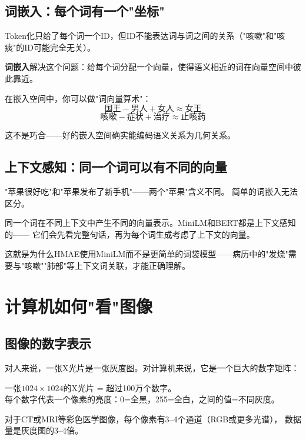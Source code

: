 \documentclass[11pt,a4paper]{ctexart}
\begin{document}
\subsection{词嵌入：每个词有一个"坐标"}

Token化只给了每个词一个ID，但ID不能表达词与词之间的关系（"咳嗽"和"咳痰"的ID可能完全无关）。

\textbf{词嵌入}解决这个问题：给每个词分配一个向量，使得语义相近的词在向量空间中彼此靠近。

\begin{exambox}[词嵌入空间中的有趣现象]
在嵌入空间中，你可以做"词向量算术"：
$$\text{国王} - \text{男人} + \text{女人} \approx \text{女王}$$
$$\text{咳嗽} - \text{症状} + \text{治疗} \approx \text{止咳药}$$

这不是巧合——好的嵌入空间确实能编码语义关系为几何关系。
\end{exambox}

\subsection{上下文感知：同一个词可以有不同的向量}

"苹果很好吃"和"苹果发布了新手机"——两个"苹果"含义不同。
简单的词嵌入无法区分。

\begin{defbox}
同一个词在不同上下文中产生不同的向量表示。MiniLM和BERT都是上下文感知的——
它们会先看完整句话，再为每个词生成考虑了上下文的向量。
\end{defbox}

这就是为什么HMAE使用MiniLM而不是更简单的词袋模型——病历中的"发烧"需要与"咳嗽""肺部"等上下文词关联，才能正确理解。

\newpage

\section{计算机如何"看"图像}

\subsection{图像的数字表示}

对人来说，一张X光片是一张灰度图。对计算机来说，它是一个巨大的数字矩阵：

\begin{exambox}[一张X光片的数字表示]
一张$1024 \times 1024$的X光片 = 超过100万个数字。\\
每个数字代表一个像素的亮度：0=全黑，255=全白，之间的值=不同灰度。

对于CT或MRI等彩色医学图像，每个像素有3--4个通道（RGB或更多光谱），
数据量是灰度图的3--4倍。
\end{exambox}
\end{document}

